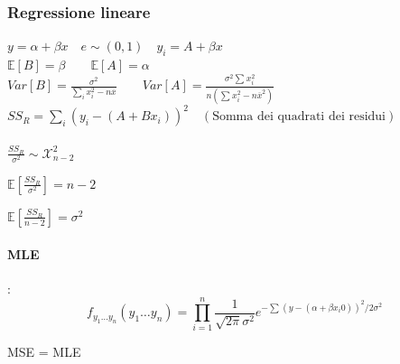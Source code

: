 \documentclass[]{article}
\newcommand{\ev}{\mathbb{E}[X]}
\renewcommand{\ev}[1]{\mathbb{E}[#1]}
\begin{document}
    \subsubsection{Regressione lineare}
    $y = \alpha + \beta x \quad e \sim(0,1) \quad y_i = A + \beta x$ \\[4ex]
    $\ev{B} = \beta \qquad \ev{A} = \alpha$ \\
    $Var[B] = \frac{\sigma^2}{\sum_{i}^{}x^2_i - n\overline{x}} \qquad Var[A] = \frac{\sigma^2 \sum_{}^{} x^2_i}{n(\sum_{}^{} x^2_i - n\overline{x}^2)}$ \\[4ex]
    $SS_R = \sum_{i}^{} (y_i - (A+B x_i))^2 \quad (\text{Somma dei quadrati dei residui})$ \\\\
    $\frac{SS_R}{\sigma^2} \sim \mathcal{X}^2_{n-2}$ \\[4ex]
    \begin{minipage}{0.45\textwidth}
        $\ev{\frac{SS_R}{\sigma^2}} = n-2$
    \end{minipage}
    \begin{minipage}{0.45\textwidth}
        $\ev{\frac{SS_R}{n-2}} = \sigma^2$
    \end{minipage}
    \paragraph{MLE}: \\
    \[ f_{y_1 \ldots y_n} (y_1 \ldots y_n) = \prod_{i= 1}^{n} \frac{1}{\sqrt{2 \pi} \sigma^2} e^{-\sum_{}^{} (y-(\alpha + \beta x_i0))^2 / 2\sigma^2} \]
    \centerline{MSE = MLE}
\end{document}
